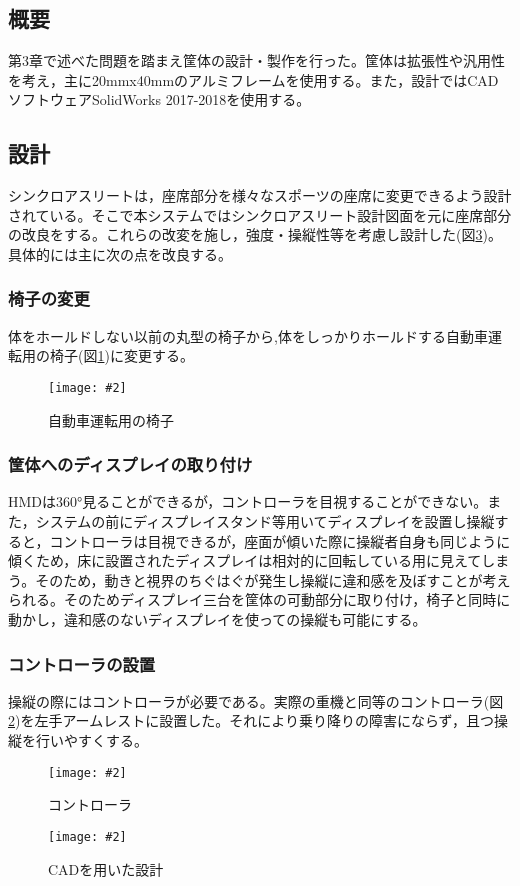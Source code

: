 \documentclass[a4paper,12pt]{jsarticle}
\newcommand{\figuref}[1]{図\ref{#1}}
\newcommand{\fig}[4][width=\textwidth]{
    \begin{figure}[!h]
    \begin{center}
    \texttt{[image: \#2]}
    \caption{#3}
    \label{#4}
    \vspace*{-1cm}
    \end{center}
    \end{figure}
}
\begin{document}
\subsection{概要}
第3章で述べた問題を踏まえ筐体の設計・製作を行った。筐体は拡張性や汎用性を考え，主に20mmx40mmのアルミフレームを使用する。また，設計ではCADソフトウェアSolidWorks 2017-2018を使用する。

\subsection{設計}
シンクロアスリートは，座席部分を様々なスポーツの座席に変更できるよう設計されている。そこで本システムではシンクロアスリート設計図面を元に座席部分の改良をする。これらの改変を施し，強度・操縦性等を考慮し設計した(\figuref{cad})。具体的には主に次の点を改良する。

\subsubsection{椅子の変更}
体をホールドしない以前の丸型の椅子から,体をしっかりホールドする自動車運転用の椅子(\figuref{recaro})に変更する。
\fig[width=9cm]{image/recaro.png}{自動車運転用の椅子}{recaro}

\subsubsection{筐体へのディスプレイの取り付け}
HMDは360°見ることができるが，コントローラを目視することができない。また，システムの前にディスプレイスタンド等用いてディスプレイを設置し操縦すると，コントローラは目視できるが，座面が傾いた際に操縦者自身も同じように傾くため，床に設置されたディスプレイは相対的に回転している用に見えてしまう。そのため，動きと視界のちぐはぐが発生し操縦に違和感を及ぼすことが考えられる。そのためディスプレイ三台を筐体の可動部分に取り付け，椅子と同時に動かし，違和感のないディスプレイを使っての操縦も可能にする。

\subsubsection{コントローラの設置}
操縦の際にはコントローラが必要である。実際の重機と同等のコントローラ(\figuref{controller})を左手アームレストに設置した。それにより乗り降りの障害にならず，且つ操縦を行いやすくする。

\fig[width=2cm]{image/controller.jpg}{コントローラ}{controller}
\fig[width=8cm]{image/cad.png}{CADを用いた設計}{cad}
\clearpage
\end{document}
